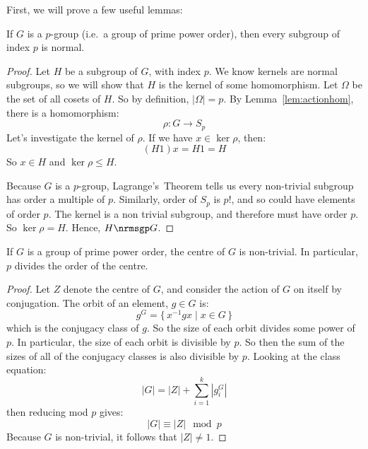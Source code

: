 First, we will prove a few useful lemmas:

\begin{lemma}\label{lem:index_p_normal}
    \raggedright
    If \(G\) is a \(p\)-group (i.e.\ a group of prime power order), then every subgroup of index \(p\) is normal.
\end{lemma}

\begin{proof}
    Let \(H\) be a subgroup of \(G\), with index \(p\).
    We know kernels are normal subgroups, so we will show that \(H\) is the kernel of some homomorphism.
    Let \(\Omega\) be the set of all cosets of \(H\).
    So by definition, \(|\Omega| = p\).
    By Lemma~\ref{lem:actionhom}, there is a homomorphism:
    \[\rho:G \to S_p\]
    Let's investigate the kernel of \(\rho\).
    If we have \(x \in \ker{\rho}\), then:
    \[(H1)x = H1 = H\]
    So \(x \in H\) and \(\ker{\rho} \leqslant H\).

    Because \(G\) is a \(p\)-group, Lagrange's~Theorem tells us every non-trivial subgroup has order a multiple of \(p\).
    Similarly, order of \(S_{p}\) is \(p!\), and so could have elements of order \(p\).
    The kernel is a non trivial subgroup, and therefore must have order \(p\).
    So \(\ker\rho = H\).
    Hence, \(H \nrmsgp G\).
\end{proof}

\begin{lemma}\label{lem:z_non_trivial}
    \raggedright
    If \(G\) is a group of prime power order, the centre of \(G\) is non-trivial.
    In particular, \(p\) divides the order of the centre.
\end{lemma}

\begin{proof}
    Let \(Z\) denote the centre of \(G\), and consider the action of \(G\) on itself by conjugation.
    The orbit of an element, \(g \in G\) is:
    \[g^G = \{\,x^{-1}gx \mid x \in G\,\}\]
    which is the conjugacy class of \(g\).
    So the size of each orbit divides some power of \(p\).
    In particular, the size of each orbit is divisible by \(p\).
    So then the sum of the sizes of all of the conjugacy classes is also divisible by \(p\).
    Looking at the class equation:
    \[|G| = |Z| + \sum_{i=1}^k |g_i^G|\]
    then reducing mod \(p\) gives:
    \[|G| \equiv |Z| \mod{p}\]
    Because \(G\) is non-trivial, it follows that \(|Z| \neq 1\).

\end{proof}

